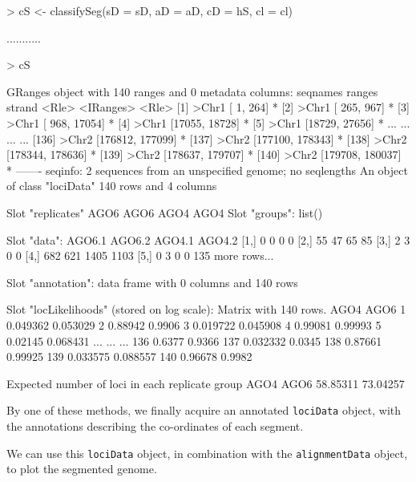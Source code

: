 \documentclass[a4paper]{article}
\begin{document}
\begin{Schunk}
\begin{Sinput}
> cS <- classifySeg(sD = sD, aD = aD, cD = hS, cl = cl)      
\end{Sinput}
\begin{Soutput}
...........
\end{Soutput}
\begin{Sinput}
> cS
\end{Sinput}
\begin{Soutput}
GRanges object with 140 ranges and 0 metadata columns:
        seqnames           ranges strand
           <Rle>        <IRanges>  <Rle>
    [1]    >Chr1   [    1,   264]      *
    [2]    >Chr1   [  265,   967]      *
    [3]    >Chr1   [  968, 17054]      *
    [4]    >Chr1   [17055, 18728]      *
    [5]    >Chr1   [18729, 27656]      *
    ...      ...              ...    ...
  [136]    >Chr2 [176812, 177099]      *
  [137]    >Chr2 [177100, 178343]      *
  [138]    >Chr2 [178344, 178636]      *
  [139]    >Chr2 [178637, 179707]      *
  [140]    >Chr2 [179708, 180037]      *
  -------
  seqinfo: 2 sequences from an unspecified genome; no seqlengths
An object of class "lociData"
140 rows and 4 columns

Slot "replicates"
AGO6 AGO6 AGO4 AGO4
Slot "groups":
list()

Slot "data":
     AGO6.1 AGO6.2 AGO4.1 AGO4.2
[1,]      0      0      0      0
[2,]     55     47     65     85
[3,]      2      3      0      0
[4,]    682    621   1405   1103
[5,]      0      3      0      0
135 more rows...

Slot "annotation":
data frame with 0 columns and 140 rows

Slot "locLikelihoods" (stored on log scale):
Matrix with  140  rows.
        AGO4     AGO6
1   0.049362 0.053029
2    0.88942   0.9906
3   0.019722 0.045908
4    0.99081  0.99993
5    0.02145 0.068431
...      ...      ...
136   0.6377   0.9366
137 0.032332   0.0345
138  0.87661  0.99925
139 0.033575 0.088557
140  0.96678   0.9982

Expected number of loci in each replicate group
    AGO4     AGO6 
58.85311 73.04257 
\end{Soutput}
\end{Schunk}



By one of these methods, we finally acquire an annotated \verb'lociData' object, with the annotations describing the co-ordinates of each segment.


We can use this \verb'lociData' object, in combination with the \verb'alignmentData' object, to plot the segmented genome.
\end{document}
